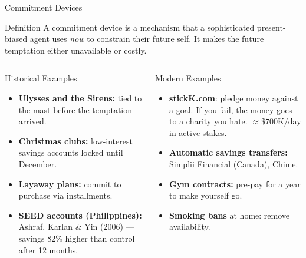 \documentclass[aspectratio=169]{beamer}
\begin{document}
\begin{frame}{Commitment Devices}
\begin{block}{Definition}
A \alert{commitment device} is a mechanism that a sophisticated present-biased agent uses \textit{now} to constrain their future self. It makes the future temptation either unavailable or costly.
\end{block}
\begin{columns}
\begin{exampleblock}{Historical Examples}
\begin{itemize}
  \item \textbf{Ulysses and the Sirens:} tied to the mast before the temptation arrived.
  \item \textbf{Christmas clubs:} low-interest savings accounts locked until December.
  \item \textbf{Layaway plans:} commit to purchase via installments.
  \item \textbf{SEED accounts (Philippines):} Ashraf, Karlan \& Yin (2006) --- savings 82\% higher than control after 12 months.
\end{itemize}
\end{exampleblock}
\begin{exampleblock}{Modern Examples}
\begin{itemize}
  \item \textbf{stickK.com}: pledge money against a goal. If you fail, the money goes to a charity you hate. $\approx\$700$K/day in active stakes.
  \item \textbf{Automatic savings transfers:} Simplii Financial (Canada), Chime.
  \item \textbf{Gym contracts:} pre-pay for a year to make yourself go.
  \item \textbf{Smoking bans} at home: remove availability.
\end{itemize}
\end{exampleblock}
\end{columns}
\end{frame}
\end{document}
